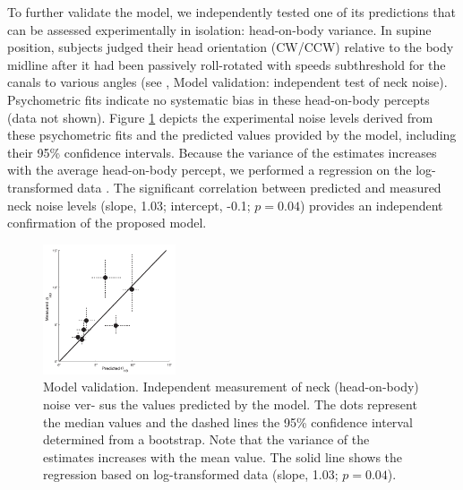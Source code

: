 To further validate the model, we independently tested one of its predictions that can be assessed experimentally in isolation: head-on-body variance. In supine position, subjects judged their head orientation (CW/CCW) relative to the body midline after it had been passively roll-rotated with speeds subthreshold for the canals to various angles (see , Model validation: independent test of neck noise). Psychometric fits indicate no systematic bias in these head-on-body percepts (data not shown). Figure \ref{p1:fig6} depicts the experimental noise levels derived from these psychometric fits and the predicted values provided by the model, including their 95\% confidence intervals. Because the variance of the estimates increases with the average head-on-body percept, we performed a regression on the log-transformed data \cite{hopkins2000}. The significant correlation between predicted and measured neck noise levels (slope, 1.03; intercept, -0.1; $p = 0.04$) provides an independent confirmation of the proposed model.

\begin{figure}
    \includegraphics[width=0.35\textwidth]{src/paper1/figure6.pdf}
    
    \caption{Model validation. Independent measurement of neck (head-on-body) noise ver- sus the values predicted by the model. The dots represent the median values and the dashed lines the 95\% confidence interval determined from a bootstrap. Note that the variance of the estimates increases with the mean value. The solid line shows the regression based on log-transformed data (slope, 1.03; $p = 0.04$).}

    \label{p1:fig6}
\end{figure}